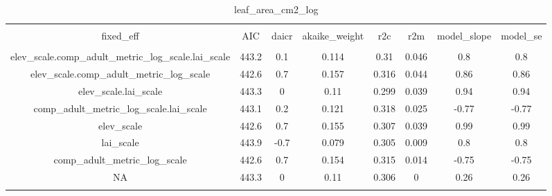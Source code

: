 
\begin{table}[!htbp] \centering 
  \caption{leaf_area_cm2_log} 
  \label{leaf_area_cm2_log} 
\begin{tabular}{@{\extracolsep{5pt}} cccccccc} 
\\[-1.8ex]\hline 
\hline \\[-1.8ex] 
fixed\_eff & AIC & daicr & akaike\_weight & r2c & r2m & model\_slope & model\_se \\ 
\hline \\[-1.8ex] 
elev\_scale.comp\_adult\_metric\_log\_scale.lai\_scale & 443.2 & 0.1 & 0.114 & 0.31 & 0.046 & 0.8 & 0.8 \\ 
elev\_scale.comp\_adult\_metric\_log\_scale & 442.6 & 0.7 & 0.157 & 0.316 & 0.044 & 0.86 & 0.86 \\ 
elev\_scale.lai\_scale & 443.3 & 0 & 0.11 & 0.299 & 0.039 & 0.94 & 0.94 \\ 
comp\_adult\_metric\_log\_scale.lai\_scale & 443.1 & 0.2 & 0.121 & 0.318 & 0.025 & -0.77 & -0.77 \\ 
elev\_scale & 442.6 & 0.7 & 0.155 & 0.307 & 0.039 & 0.99 & 0.99 \\ 
lai\_scale & 443.9 & -0.7 & 0.079 & 0.305 & 0.009 & 0.8 & 0.8 \\ 
comp\_adult\_metric\_log\_scale & 442.6 & 0.7 & 0.154 & 0.315 & 0.014 & -0.75 & -0.75 \\ 
NA & 443.3 & 0 & 0.11 & 0.306 & 0 & 0.26 & 0.26 \\ 
\hline \\[-1.8ex] 
\end{tabular} 
\end{table} 
